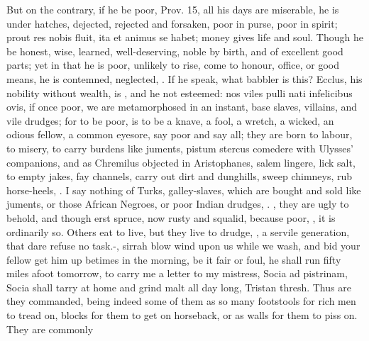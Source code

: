 {But on the contrary, if he be poor, Prov.  15, all his days are
miserable, he is under hatches, dejected, rejected and forsaken, poor
in purse, poor in spirit; prout res nobis fluit, ita et animus se
habet; money gives life and soul. Though he be honest, wise,
learned, well-deserving, noble by birth, and of excellent good parts;
yet in that he is poor, unlikely to rise, come to honour, office, or
good means, he is contemned, neglected, . If he speak, what babbler is this?
Ecclus, his nobility without wealth, is , and
he not esteemed: nos viles pulli nati infelicibus ovis, if once poor,
we are metamorphosed in an instant, base slaves, villains, and vile
drudges; for to be poor, is to be a knave, a fool, a wretch, a
wicked, an odious fellow, a common eyesore, say poor and say all; they
are born to labour, to misery, to carry burdens like juments, pistum
stercus comedere with Ulysses' companions, and as Chremilus objected in
Aristophanes,  salem lingere, lick salt, to empty jakes, fay
channels, carry out dirt and dunghills, sweep chimneys, rub
horse-heels, \etc{}. I say nothing of Turks, galley-slaves, which are
bought and sold like juments, or those African Negroes, or poor
Indian drudges, .
, they are ugly to behold, and though erst
spruce, now rusty and squalid, because poor, , it is ordinarily so. Others eat to
live, but they live to drudge, , a servile generation, that dare refuse no
task.-, sirrah blow wind upon us while we wash, and bid your fellow
get him up betimes in the morning, be it fair or foul, he shall run
fifty miles afoot tomorrow, to carry me a letter to my mistress, Socia
ad pistrinam, Socia shall tarry at home and grind malt all day long,
Tristan thresh. Thus are they commanded, being indeed some of them as
so many footstools for rich men to tread on, blocks for them to get on
horseback, or as walls for them to piss on. They are commonly
}
